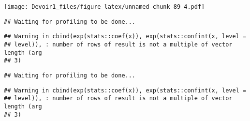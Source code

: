 \documentclass[]{article}
\newenvironment{Shaded}{\begin{snugshade}}{\end{snugshade}}
\newcommand{\KeywordTok}[1]{\textcolor[rgb]{0.13,0.29,0.53}{\textbf{#1}}}
\newcommand{\DataTypeTok}[1]{\textcolor[rgb]{0.13,0.29,0.53}{#1}}
\newcommand{\DecValTok}[1]{\textcolor[rgb]{0.00,0.00,0.81}{#1}}
\newcommand{\StringTok}[1]{\textcolor[rgb]{0.31,0.60,0.02}{#1}}
\newcommand{\OperatorTok}[1]{\textcolor[rgb]{0.81,0.36,0.00}{\textbf{#1}}}
\newcommand{\NormalTok}[1]{#1}
\begin{document}
\texttt{[image: Devoir1\_files/figure-latex/unnamed-chunk-89-4.pdf]}

\begin{Shaded}
\end{Shaded}

\begin{verbatim}
## Waiting for profiling to be done...
\end{verbatim}

\begin{verbatim}
## Warning in cbind(exp(stats::coef(x)), exp(stats::confint(x, level =
## level)), : number of rows of result is not a multiple of vector length (arg
## 3)
\end{verbatim}

\begin{verbatim}
## Waiting for profiling to be done...
\end{verbatim}

\begin{verbatim}
## Warning in cbind(exp(stats::coef(x)), exp(stats::confint(x, level =
## level)), : number of rows of result is not a multiple of vector length (arg
## 3)
\end{verbatim}
\end{document}
